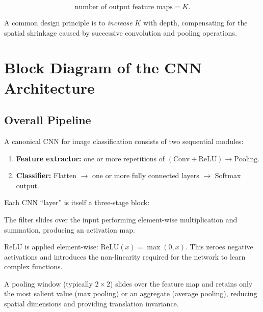 \documentclass[12pt,a4paper]{article}
\newcommand{\relu}{\mathrm{ReLU}}
\begin{document}
\begin{equation}
  \text{number of output feature maps} = K.
  \label{eq:num_fm}
\end{equation}

A common design principle is to \emph{increase} $K$ with depth, compensating
for the spatial shrinkage caused by successive convolution and pooling
operations.

\section{Block Diagram of the CNN Architecture}
\label{sec:block_diagram}

\subsection{Overall Pipeline}
\label{subsec:overall_pipeline}

A canonical CNN for image classification consists of two sequential modules:

\begin{enumerate}[label=\arabic*.]
  \item \textbf{Feature extractor:} one or more repetitions of
        $(\text{Conv} + \relu) \to \text{Pooling}$.
  \item \textbf{Classifier:} Flatten $\to$ one or more fully connected layers
        $\to$ Softmax output.
\end{enumerate}

Each CNN ``layer'' is itself a three-stage block:

\begin{description}[leftmargin=3em, style=nextline]
  \item[Stage 1 -- Convolution] The filter slides over the input performing
        element-wise multiplication and summation, producing an activation
        map.
  \item[Stage 2 -- Non-linearity] ReLU is applied element-wise:
        $\relu(x) = \max(0, x)$.  This zeroes negative activations and
        introduces the non-linearity required for the network to learn complex
        functions.
  \item[Stage 3 -- Pooling] A pooling window (typically $2\times2$) slides
        over the feature map and retains only the most salient value (max
        pooling) or an aggregate (average pooling), reducing spatial
        dimensions and providing translation invariance.
\end{description}
\end{document}
